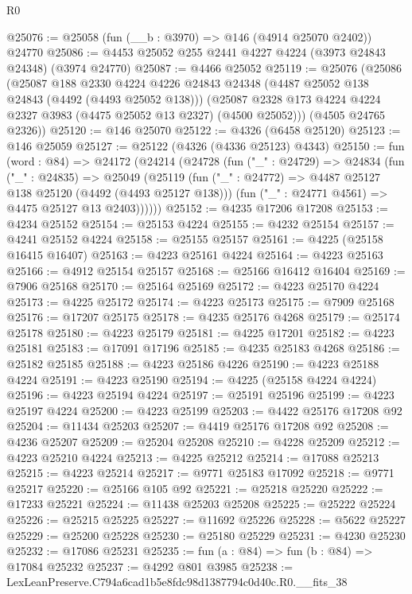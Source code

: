 \begin{lexlean}{R0}
\begin{coremodule}
@25076 := @25058 (fun (__b : @3970) => @146 (@4914 @25070 @2402)) @24770
@25086 := @4453 @25052 @255 @2441 @4227 @4224 (@3973 @24843 @24348) (@3974 @24770)
@25087 := @4466 @25052
@25119 := @25076
    (@25086
      (@25087
        @188
        @2330
        @4224
        @4226
        @24843
        @24348
        (@4487 @25052 @138 @24843 (@4492 (@4493 @25052 @138)))
        (@25087 @2328 @173 @4224 @4224 @2327 @3983 (@4475 @25052 @13 @2327) (@4500 @25052)))
      (@4505 @24765 @2326))
@25120 := @146 @25070
@25122 := @4326 (@6458 @25120)
@25123 := @146 @25059
@25127 := @25122 (@4326 (@4336 @25123) @4343)
@25150 := fun (word : @84) =>
  @24172
    (@24214
      (@24728
        (fun ("_" : @24729) =>
        @24834
          (fun ("_" : @24835) =>
          @25049
            (@25119
              (fun ("_" : @24772) => @4487 @25127 @138 @25120 (@4492 (@4493 @25127 @138)))
              (fun ("_" : @24771 @4561) => @4475 @25127 @13 @2403))))))
@25152 := @4235 @17206 @17208
@25153 := @4234 @25152
@25154 := @25153 @4224
@25155 := @4232 @25154
@25157 := @4241 @25152 @4224
@25158 := @25155 @25157
@25161 := @4225 (@25158 @16415 @16407)
@25163 := @4223 @25161 @4224
@25164 := @4223 @25163
@25166 := @4912 @25154 @25157
@25168 := @25166 @16412 @16404
@25169 := @7906 @25168
@25170 := @25164 @25169
@25172 := @4223 @25170 @4224
@25173 := @4225 @25172
@25174 := @4223 @25173
@25175 := @7909 @25168
@25176 := @17207 @25175
@25178 := @4235 @25176 @4268
@25179 := @25174 @25178
@25180 := @4223 @25179
@25181 := @4225 @17201
@25182 := @4223 @25181
@25183 := @17091 @17196
@25185 := @4235 @25183 @4268
@25186 := @25182 @25185
@25188 := @4223 @25186 @4226
@25190 := @4223 @25188 @4224
@25191 := @4223 @25190
@25194 := @4225 (@25158 @4224 @4224)
@25196 := @4223 @25194 @4224
@25197 := @25191 @25196
@25199 := @4223 @25197 @4224
@25200 := @4223 @25199
@25203 := @4422 @25176 @17208 @92
@25204 := @11434 @25203
@25207 := @4419 @25176 @17208 @92
@25208 := @4236 @25207
@25209 := @25204 @25208
@25210 := @4228 @25209
@25212 := @4223 @25210 @4224
@25213 := @4225 @25212
@25214 := @17088 @25213
@25215 := @4223 @25214
@25217 := @9771 @25183 @17092
@25218 := @9771 @25217
@25220 := @25166 @105 @92
@25221 := @25218 @25220
@25222 := @17233 @25221
@25224 := @11438 @25203 @25208
@25225 := @25222 @25224
@25226 := @25215 @25225
@25227 := @11692 @25226
@25228 := @5622 @25227
@25229 := @25200 @25228
@25230 := @25180 @25229
@25231 := @4230 @25230
@25232 := @17086 @25231
@25235 := fun (a : @84) => fun (b : @84) => @17084 @25232
@25237 := @4292 @801 @3985
@25238 := LexLeanPreserve.C794a6cad1b5e8fdc98d1387794c0d40c.R0.__fits_38

\end{coremodule}
\end{lexlean}
